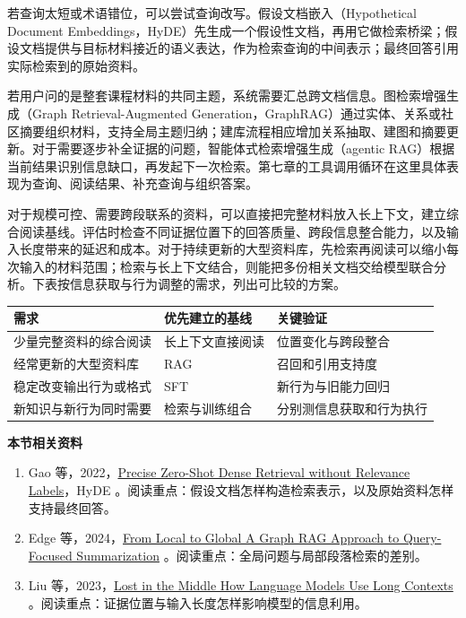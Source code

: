 若查询太短或术语错位，可以尝试查询改写。假设文档嵌入（Hypothetical Document Embeddings，HyDE）先生成一个假设性文档，再用它做检索桥梁；假设文档提供与目标材料接近的语义表达，作为检索查询的中间表示；最终回答引用实际检索到的原始资料。

若用户问的是整套课程材料的共同主题，系统需要汇总跨文档信息。图检索增强生成（Graph Retrieval-Augmented Generation，GraphRAG）通过实体、关系或社区摘要组织材料，支持全局主题归纳；建库流程相应增加关系抽取、建图和摘要更新。对于需要逐步补全证据的问题，智能体式检索增强生成（agentic RAG）根据当前结果识别信息缺口，再发起下一次检索。第七章的工具调用循环在这里具体表现为查询、阅读结果、补充查询与组织答案。

对于规模可控、需要跨段联系的资料，可以直接把完整材料放入长上下文，建立综合阅读基线。评估时检查不同证据位置下的回答质量、跨段信息整合能力，以及输入长度带来的延迟和成本。对于持续更新的大型资料库，先检索再阅读可以缩小每次输入的材料范围；检索与长上下文结合，则能把多份相关文档交给模型联合分析。下表按信息获取与行为调整的需求，列出可比较的方案。

\begin{longtable}[]{@{}
  >{\raggedright\arraybackslash}p{}
  >{\raggedright\arraybackslash}p{}
  >{\raggedright\arraybackslash}p{}@{}}
\toprule\noalign{}
\begin{minipage}[b]{\linewidth}\raggedright
\textbf{需求}
\end{minipage} & \begin{minipage}[b]{\linewidth}\raggedright
\textbf{优先建立的基线}
\end{minipage} & \begin{minipage}[b]{\linewidth}\raggedright
\textbf{关键验证}
\end{minipage} \\
\midrule\noalign{}
\endhead
\bottomrule\noalign{}
\endlastfoot
少量完整资料的综合阅读 & 长上下文直接阅读 & 位置变化与跨段整合 \\
经常更新的大型资料库 & RAG & 召回和引用支持度 \\
稳定改变输出行为或格式 & SFT & 新行为与旧能力回归 \\
新知识与新行为同时需要 & 检索与训练组合 & 分别测信息获取和行为执行 \\
\end{longtable}

\textbf{本节相关资料}
\begin{enumerate}
    \item Gao 等，2022，\href{https://arxiv.org/abs/2212.10496}{Precise Zero-Shot Dense Retrieval without Relevance Labels}，HyDE 。阅读重点：假设文档怎样构造检索表示，以及原始资料怎样支持最终回答。
    \item Edge 等，2024，\href{https://arxiv.org/abs/2404.16130}{From Local to Global A Graph RAG Approach to Query-Focused Summarization} 。阅读重点：全局问题与局部段落检索的差别。
    \item Liu 等，2023，\href{https://arxiv.org/abs/2307.03172}{Lost in the Middle How Language Models Use Long Contexts} 。阅读重点：证据位置与输入长度怎样影响模型的信息利用。
\end{enumerate}
